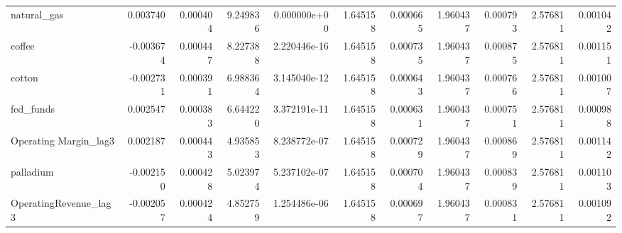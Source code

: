 \documentclass[12pt,a4paper,english]{article}
\begin{document}
{{\begin{tabular}{@{}lrrrrrrrrrr@{}}
			natural\_gas                  & 0.003740                 & 0.000404                    & 9.249836                  & 0.000000e+00                             & 1.645158                      & 0.000665                      & 1.960437                     & 0.000793                     & 2.576811                     & 0.001042                     \\
			coffee                        & -0.003674                & 0.000447                    & 8.227388                  & 2.220446e-16                             & 1.645158                      & 0.000735                      & 1.960437                     & 0.000875                     & 2.576811                     & 0.001151                     \\
			cotton                        & -0.002731                & 0.000391                    & 6.988364                  & 3.145040e-12                             & 1.645158                      & 0.000643                      & 1.960437                     & 0.000766                     & 2.576811                     & 0.001007                     \\
			fed\_funds                    & 0.002547                 & 0.000383                    & 6.644220                  & 3.372191e-11                             & 1.645158                      & 0.000631                      & 1.960437                     & 0.000751                     & 2.576811                     & 0.000988                     \\
			Operating Margin\_lag3        & 0.002187                 & 0.000443                    & 4.935853                  & 8.238772e-07                             & 1.645158                      & 0.000729                      & 1.960437                     & 0.000869                     & 2.576811                     & 0.001142                     \\
			palladium                     & -0.002150                & 0.000428                    & 5.023974                  & 5.237102e-07                             & 1.645158                      & 0.000704                      & 1.960437                     & 0.000839                     & 2.576811                     & 0.001103                     \\
			OperatingRevenue\_lag3        & -0.002057                & 0.000424                    & 4.852759                  & 1.254486e-06                             & 1.645158                      & 0.000697                      & 1.960437                     & 0.000831                     & 2.576811                     & 0.001092                     \\

\end{tabular}}}
\end{document}
